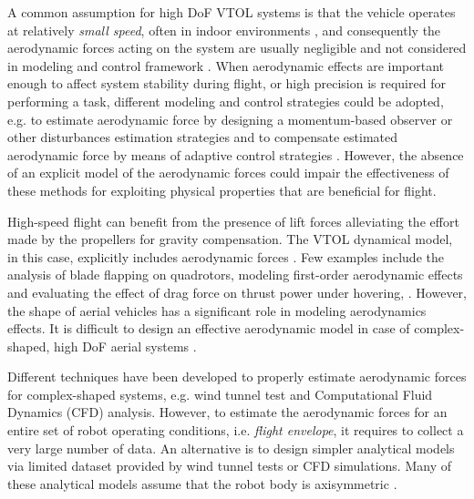 A common assumption for high DoF VTOL systems is that the vehicle operates at relatively \emph{small speed}, often in indoor environments \cite{jimenez2013,heredia2014,mellinger2011}, and  consequently the aerodynamic forces acting on the system are usually negligible and not considered in modeling and control framework \cite{ollero2021,orsag2017dexterous}. When aerodynamic effects are important enough to affect system stability during flight, or high precision is required for performing a task, different modeling and control strategies could be adopted, e.g. to estimate aerodynamic force by designing a momentum-based observer or other disturbances estimation strategies \cite{ruggiero2014impedance,cabecinhas2014nonlinear} and to compensate estimated aerodynamic force by means of adaptive control strategies \cite{roberts2010adaptive,antonelli2013adaptive}. However, the absence of an explicit model of the aerodynamic forces could impair the effectiveness of these methods for exploiting physical properties that are beneficial for flight.

High-speed flight can benefit from the presence of lift forces alleviating the effort made by the propellers for gravity compensation. The VTOL dynamical model, in this case, explicitly includes aerodynamic forces \cite{pucci2015nonlinear,hua2013introduction,hamel2019unified}. Few examples include the analysis of blade flapping on quadrotors, modeling first-order aerodynamic effects and evaluating the effect of drag force on thrust power under hovering, \cite{huang2009aerodynamics}\cite{kroo2000mesicopter}\cite{mokhtari2004dynamic}. However, the shape of aerial vehicles has a significant role in modeling aerodynamics effects. It is difficult to design an effective aerodynamic model in case of complex-shaped, high DoF aerial systems \cite{ruggiero2018aerial,hua2013introduction}.

Different techniques have been developed to properly estimate aerodynamic forces for complex-shaped systems, e.g. wind tunnel test and Computational Fluid Dynamics (CFD) analysis. However, to estimate the aerodynamic forces for an entire set of robot operating conditions, i.e. \emph{flight envelope}, it requires to collect a very large number of data. An alternative is to design simpler analytical models via limited dataset provided by wind tunnel tests or CFD simulations. Many of these analytical models assume that the robot body is axisymmetric \cite{pucci2015nonlinear,divitiis2010fully,albisser2013identifiability}.

